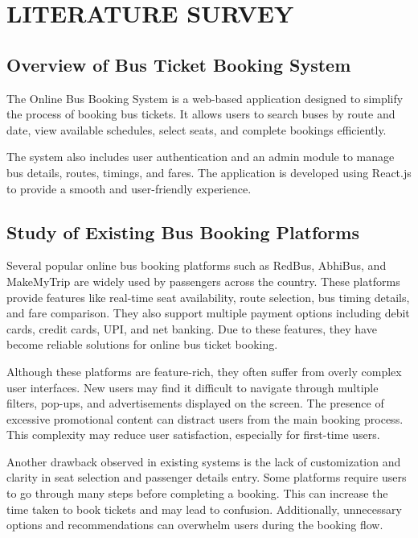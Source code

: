 \chapter{LITERATURE SURVEY}

\section{Overview of Bus Ticket Booking System}

The Online Bus Booking System is a web-based application designed to simplify the process of booking bus tickets. It allows users to search buses by route and date, view available schedules, select seats, and complete bookings efficiently.

The system also includes user authentication and an admin module to manage bus details, routes, timings, and fares. The application is developed using React.js to provide a smooth and user-friendly experience.

\section{Study of Existing Bus Booking Platforms}

Several popular online bus booking platforms such as RedBus, AbhiBus, and MakeMyTrip are widely used by passengers across the country. These platforms provide features like real-time seat availability, route selection, bus timing details, and fare comparison. They also support multiple payment options including debit cards, credit cards, UPI, and net banking. Due to these features, they have become reliable solutions for online bus ticket booking.

Although these platforms are feature-rich, they often suffer from overly complex user interfaces. New users may find it difficult to navigate through multiple filters, pop-ups, and advertisements displayed on the screen. The presence of excessive promotional content can distract users from the main booking process. This complexity may reduce user satisfaction, especially for first-time users.

Another drawback observed in existing systems is the lack of customization and clarity in seat selection and passenger details entry. Some platforms require users to go through many steps before completing a booking. This can increase the time taken to book tickets and may lead to confusion. Additionally, unnecessary options and recommendations can overwhelm users during the booking flow.

